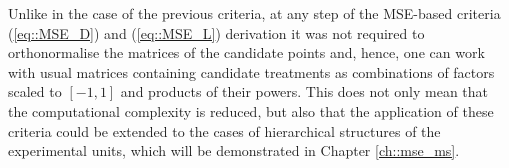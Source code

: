 Unlike in the case of the previous criteria, at any step of the MSE-based criteria (\ref{eq::MSE_D}) and (\ref{eq::MSE_L}) derivation it was not required to orthonormalise the matrices of the candidate points and, hence, one can work with usual matrices containing candidate treatments as combinations of factors scaled to $[-1,1]$ and products of their powers. This does not only mean that the computational complexity is reduced, but also that the application of these criteria could be extended to the cases of hierarchical structures of the experimental units, which will be demonstrated in Chapter \ref{ch::mse_ms}.

